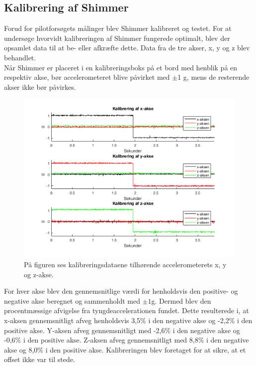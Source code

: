 \subsection{Kalibrering af Shimmer}
Forud for pilotforsøgets målinger blev Shimmer kalibreret og testet. For at undersøge hvorvidt kalibreringen af Shimmer fungerede optimalt, blev der opsamlet data til at be- eller afkræfte dette. Data fra de tre akser, x, y og z blev behandlet. \\
Når Shimmer er placeret i en kalibreringsboks på et bord med henblik på en respektiv akse, bør accelerometeret blive påvirket med $\pm$1 g, mens de resterende akser ikke bør påvirkes.
\begin{figure}[H]
	\centering
	\includegraphics[scale=0.68]{figures/qBilag/kalibreringsdata}
	\caption{På figuren ses kalibreringsdataene tilhørende accelerometerets x, y og z-akse.}
	\label{fig:Ap_Kalibrering}
\end{figure}
For hver akse blev den gennemsnitlige værdi for henholdsvis den positive- og negative akse beregnet og sammenholdt med $\pm 1$g. Dermed blev den procentmæssige afvigelse fra tyngdeaccelerationen fundet. Dette resulterede i, at x-aksen gennemsnitligt afveg henholdsvis 3,5\% i den negative akse og -2,2\% i den positive akse. Y-aksen afveg gennemsnitligt med -2,6\% i den negative akse og -0,6\% i den positive akse. Z-aksen afveg  gennemsnitligt med 8,8\% i den negative akse og 8,0\% i den positive akse. \newline
Kalibreringen blev foretaget for at sikre, at et offset ikke var til stede. 

